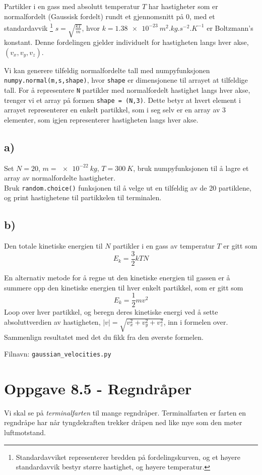 \documentclass[10pt,a4paper]{article}
\begin{document}
Partikler i en gass med absolutt temperatur $T$ har hastigheter som er normalfordelt (Gaussisk fordelt) rundt et gjennomsnitt på 0, med et standardavvik \footnote{Standardavviket representerer bredden på fordelingskurven, og et høyere standardavvik bestyr større hastighet, og høyere temperatur.} $s = \sqrt{\frac{kT}{m}}$, hvor $k = \SI{1.38e-23}{m^2.kg.s^{-2}.K^{-1}}$ er Boltzmann's konstant. Denne fordelingen gjelder individuelt for hastigheten langs hver akse, $(v_x,v_y,v_z)$.
 
Vi kan generere tilfeldig normalfordelte tall med numpyfunksjonen \texttt{numpy.normal(m,s,shape)}, hvor \texttt{shape} er dimensjonene til arrayet at tilfeldige tall. For å representere \texttt{N} partikler med normalfordelt hastighet langs hver akse, trenger vi et array på formen \texttt{shape = (N,3)}. Dette betyr at hvert element i arrayet representerer en enkelt partikkel, som i seg selv er en array av 3 elementer, som igjen representerer hastigheten langs hver akse.
 
\subsection*{a)}
Set $N = 20$, $m = \SI{e-22}{kg}$, $T = \SI{300}{K}$, bruk numpyfunksjonen til å lagre et array av normalfordelte hastigheter.\\
Bruk \texttt{random.choice()} funksjonen til å velge ut en tilfeldig av de 20 partiklene, og print hastighetene til partikkelen til terminalen.
 
\subsection*{b)}
Den totale kinetiske energien til $N$ partikler i en gass av temperatur $T$ er gitt som
\[	E_k = \frac{3}{2}kTN
\]
 
En alternativ metode for å regne ut den kinetiske energien til gassen er å summere opp den kinetiske energien til hver enkelt partikkel, som er gitt som
\[	E_k = \frac{1}{2}mv^2
\]
Loop over hver partikkel, og beregn deres kinetiske energi ved å sette absoluttverdien av hastigheten, $|v| = \sqrt{v_x^2 + v_y^2 + v_z^2}$, inn i formelen over. Sammenlign resultatet med det du fikk fra den øverste formelen.
 
Filnavn: \texttt{gaussian\_velocities.py}
 
 
 
\section*{Oppgave 8.5 - Regndråper}
Vi skal se på \textit{terminalfarten} til mange regndråper. Terminalfarten er farten en regndråpe har når tyngdekraften trekker dråpen ned like mye som den møter luftmotstand. 
 
\end{document}
